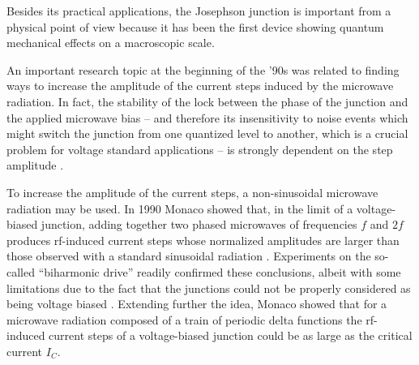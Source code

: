 Besides its practical applications, the Josephson junction is important from a physical point of view because it has been the first device showing quantum mechanical effects on a macroscopic scale.



An important research topic at the beginning of the '90s was related to finding ways to increase the amplitude of the current steps induced by the microwave radiation. In fact, the stability of the lock between the phase of the junction and the applied microwave bias -- and therefore its insensitivity to noise events which might switch the junction from one quantized level to another, which is a crucial problem for voltage standard applications -- is strongly dependent on the step amplitude \cite{Kautz:1987}.

To increase the amplitude of the current steps, a non-sinusoidal microwave radiation may be used.
In 1990 Monaco showed that, in the limit of a voltage-biased junction, adding together two phased microwaves of frequencies $f$ and $2 f$ produces rf-induced current steps whose  normalized amplitudes are larger than those observed with a standard sinusoidal radiation \cite{Monaco:1990}. 
Experiments on the so-called ``biharmonic drive'' readily confirmed these conclusions, albeit with some limitations due to the fact that the junctions could not be properly considered as being voltage biased \cite{Andreone:1991, Andreone:1992}.
Extending further the idea, Monaco showed that for a microwave radiation composed of a train of periodic delta functions the rf-induced current steps of a voltage-biased junction could be as large as the critical current $I_C$.

